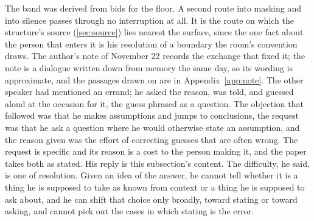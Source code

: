 The band was derived from bids for the floor. A second route into masking and into silence passes through no interruption at all. It is the route on which the structure's source (\autoref{sec:source}) lies nearest the surface, since the one fact about the person that enters it is his resolution of a boundary the room's convention draws. The author's note of November 22 records the exchange that fixed it; the note is a dialogue written down from memory the same day, so its wording is approximate, and the passages drawn on are in Appendix~\ref{app:note}. The other speaker had mentioned an errand; he asked the reason, was told, and guessed aloud at the occasion for it, the guess phrased as a question. The objection that followed was that he makes assumptions and jumps to conclusions, the request was that he ask a question where he would otherwise state an assumption, and the reason given was the effort of correcting guesses that are often wrong. The request is specific and its reason is a cost to the person making it, and the paper takes both as stated. His reply is this subsection's content. The difficulty, he said, is one of resolution. Given an idea of the answer, he cannot tell whether it is a thing he is supposed to take as known from context or a thing he is supposed to ask about, and he can shift that choice only broadly, toward stating or toward asking, and cannot pick out the cases in which stating is the error.

